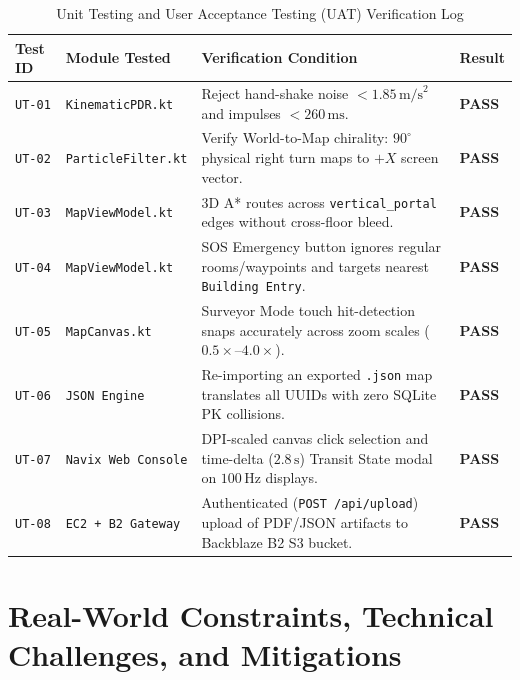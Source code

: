 \documentclass[11pt,a4paper]{article}
\begin{document}
\begin{table}[h!]
\centering
\caption{Unit Testing and User Acceptance Testing (UAT) Verification Log}
\label{tab:unit_tests}
\renewcommand{\arraystretch}{1.25}
\footnotesize
\begin{tabularx}{\textwidth}{L{1.4cm} L{3.2cm} Y C{1.6cm}}
\toprule
\textbf{Test ID} & \textbf{Module Tested} & \textbf{Verification Condition} & \textbf{Result} \\
\midrule
\texttt{UT-01} & \texttt{KinematicPDR.kt} & Reject hand-shake noise $< 1.85\,\text{m/s}^2$ and impulses $< 260\,\text{ms}$. & \textbf{PASS} \\
\texttt{UT-02} & \texttt{ParticleFilter.kt} & Verify World-to-Map chirality: $90^\circ$ physical right turn maps to $+X$ screen vector. & \textbf{PASS} \\
\texttt{UT-03} & \texttt{MapViewModel.kt} & 3D A* routes across \texttt{vertical\_portal} edges without cross-floor bleed. & \textbf{PASS} \\
\texttt{UT-04} & \texttt{MapViewModel.kt} & SOS Emergency button ignores regular rooms/waypoints and targets nearest \texttt{Building Entry}. & \textbf{PASS} \\
\texttt{UT-05} & \texttt{MapCanvas.kt} & Surveyor Mode touch hit-detection snaps accurately across zoom scales ($0.5\times\text{--}4.0\times$). & \textbf{PASS} \\
\texttt{UT-06} & \texttt{JSON Engine} & Re-importing an exported \texttt{.json} map translates all UUIDs with zero SQLite PK collisions. & \textbf{PASS} \\
\texttt{UT-07} & \texttt{Navix Web Console} & DPI-scaled canvas click selection and time-delta ($2.8\,\text{s}$) Transit State modal on $100\,\text{Hz}$ displays. & \textbf{PASS} \\
\texttt{UT-08} & \texttt{EC2 + B2 Gateway} & Authenticated (\texttt{POST /api/upload}) upload of PDF/JSON artifacts to Backblaze B2 S3 bucket. & \textbf{PASS} \\
\bottomrule
\end{tabularx}
\end{table}

\section{Real-World Constraints, Technical Challenges, and Mitigations}
\end{document}
